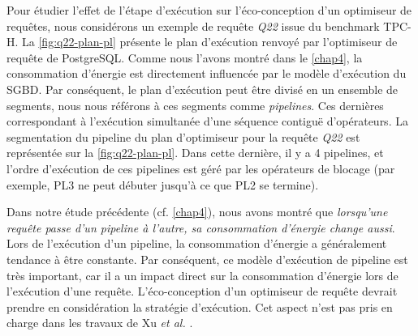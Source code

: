 Pour étudier l'effet de l'étape d'exécution sur l'éco-conception d'un optimiseur de requêtes, nous considérons un exemple de requête \textit{Q22} issue du benchmark TPC-H.
La \ref{fig:q22-plan-pl} présente le plan d'exécution renvoyé par l'optimiseur de requête de PostgreSQL. Comme nous l'avons montré dans le \ref{chap4}, la consommation d'énergie est directement influencée par le modèle d'exécution du SGBD. Par conséquent, le plan d'exécution peut être divisé en un ensemble de segments, nous nous référons à ces segments comme \textit{pipelines}. Ces dernières correspondant à l'exécution simultanée d'une séquence contiguë d'opérateurs.
La segmentation du pipeline du plan d'optimiseur pour la requête \textit{Q22} est représentée sur la \ref{fig:q22-plan-pl}. Dans cette dernière, il y a 4 pipelines, et l'ordre d'exécution de ces pipelines est géré par les opérateurs de blocage (par exemple, PL3 ne peut débuter jusqu'à ce que PL2 se termine).

Dans notre étude précédente (cf. \ref{chap4}), nous avons montré que \textit{lorsqu'une requête passe d'un pipeline à l'autre, sa consommation d'énergie change aussi}. Lors de l'exécution d'un pipeline, la consommation d'énergie a généralement tendance à être constante. Par conséquent, ce modèle d'exécution de pipeline est très important, car il a un impact direct sur la consommation d'énergie lors de l'exécution d'une requête. L'éco-conception d'un optimiseur de requête devrait prendre en considération la stratégie d'exécution. Cet aspect n'est pas pris en charge dans les travaux de Xu \textit{et al.} \cite{Xu10b}.

